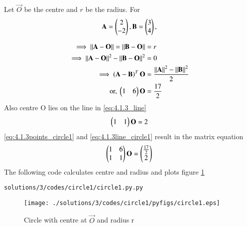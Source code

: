 \item Let $\vec{O}$ be the centre and  $r$ be the radius.  For 
\begin{align}
\mathbf{A} = \begin{pmatrix}2\\-2\end{pmatrix}, \mathbf{B} = \begin{pmatrix}3\\4\end{pmatrix},
\end{align}

\begin{align}
\implies \left\lVert\mathbf{A}-\mathbf{O}\right\rVert = \left\lVert\mathbf{B}-\mathbf{O}\right\rVert &= r
\\
\implies \left\lVert\mathbf{A}-\mathbf{O}\right\rVert^2 - \left\lVert\mathbf{B}-\mathbf{O}\right\rVert^2  &= 0
\\
\implies \left(\mathbf{A}-\mathbf{B}\right)^T\mathbf{O} &=   \frac{\left\lVert\mathbf{A}\right\rVert^2- \left\lVert\mathbf{B}\right\rVert^2}{2}
\\
\text{or, } \begin{pmatrix}1 & 6\end{pmatrix}\mathbf{O} &= \frac{17}{2}
\label{eq:4.1.3points_circle1}
\end{align}
Also centre O lies on the line in \eqref{eq:4.1.3_line}
%
\begin{align}
\begin{pmatrix}1&1\end{pmatrix} \mathbf{O} = 2
\label{eq:4.1.3line_circle1}
\end{align}
\eqref{eq:4.1.3points_circle1} and \eqref{eq:4.1.3line_circle1} result in the matrix equation
\begin{align}
\begin{pmatrix}1 & 6 \\ 1 & 1\end{pmatrix}\mathbf{O} = \begin{pmatrix}\frac{17}{2}\\2\end{pmatrix}
\label{eq:4.1.3finding_centre1}
\end{align}
%
The following code calculates centre and radius and plots figure \ref{fig:4.1.3_circle1}
\begin{lstlisting}
solutions/3/codes/circle1/circle1.py.py
\end{lstlisting}
\begin{figure}[!ht]
\centering
\texttt{[image: ./solutions/3/codes/circle1/pyfigs/circle1.eps]}
\caption{Circle with centre at $\vec{O}$ and radius r}
\label{fig:4.1.3_circle1}
\end{figure}

